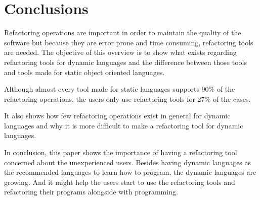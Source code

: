 
% 
% 

\section{Conclusions}



Refactoring operations are important in order to maintain the quality of the software but because they are error prone and time consuming, refactoring tools are needed.
The objective of this overview is to show what exists regarding refactoring tools for dynamic languages and the difference between those tools and tools made for static object oriented languages.


Although almost every tool made for static languages supports 90\% of the refactoring operations, the users only use refactoring tools for 27\% of the cases. %

It also shows how few refactoring operations exist in general for dynamic languages and why it is more difficult to make a refactoring tool for dynamic languages.

In conclusion, this paper shows the importance of having a refactoring tool concerned about the unexperienced users. 
Besides having dynamic languages as the recommended languages to learn how to program, the dynamic languages are growing. 
And it might help the users start to use the refactoring tools and refactoring their programs alongside with programming.

